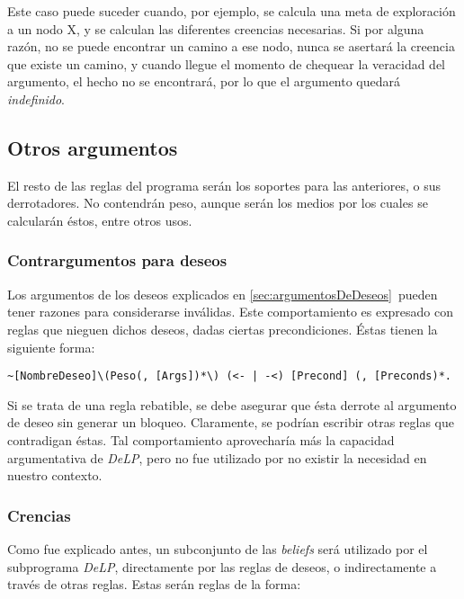 \documentclass[oneside]{book}
\begin{document}
Este caso puede suceder cuando, por ejemplo, se calcula una meta de 
exploración a un nodo X, y se calculan las diferentes creencias necesarias. Si por 
alguna razón, no se puede encontrar un camino a ese nodo, nunca se asertará la creencia
que existe un camino, y cuando llegue el momento de chequear la veracidad del argumento,
el hecho no se encontrará, por lo que el argumento quedará \textit{indefinido}. 

\subsection{Otros argumentos}

El resto de las reglas del programa serán los soportes para las anteriores, 
o sus derrotadores. No 
contendrán peso, aunque serán los medios por los cuales se calcularán éstos, entre
otros usos.

\subsubsection{Contrargumentos para deseos}

Los argumentos de los deseos explicados en \ref{sec:argumentosDeDeseos}\ pueden tener
razones para considerarse inválidas. Este comportamiento es expresado con reglas que 
nieguen dichos deseos, dadas ciertas precondiciones. Éstas tienen la siguiente forma:

\begin{verbatim}
~[NombreDeseo]\(Peso(, [Args])*\) (<- | -<) [Precond] (, [Preconds)*.
\end{verbatim}

Si se trata de una regla rebatible, se debe asegurar que ésta derrote al argumento
de deseo sin generar un bloqueo. Claramente, se podrían escribir otras reglas que
contradigan éstas. Tal comportamiento aprovecharía más la capacidad argumentativa 
de \textit{DeLP}, pero no fue utilizado por no existir la necesidad
en nuestro contexto.

\subsubsection{Crencias}

\label{sec:creencias}

Como fue explicado antes, %
un subconjunto de las  \textit{beliefs} será utilizado por el subprograma 
\textit{DeLP}, directamente por 
las reglas de deseos, o indirectamente a través de otras reglas. Estas serán reglas de 
la forma:
\end{document}
